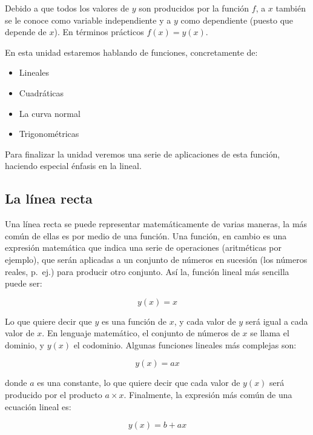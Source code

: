 \documentclass[
]{book}
\providecommand{\tightlist}{%
  \setlength{\itemsep}{0pt}\setlength{\parskip}{0pt}}
\begin{document}
Debido a que todos los valores de \(y\) son producidos por la función \(f\), a \(x\) también se le conoce como variable independiente y a \(y\) como dependiente (puesto que depende de \(x\)). En términos prácticos \(f(x) = y(x)\).

En esta unidad estaremos hablando de funciones, concretamente de:

\begin{itemize}
\tightlist
\item
  Lineales
\item
  Cuadráticas
\item
  La curva normal
\item
  Trigonométricas
\end{itemize}

Para finalizar la unidad veremos una serie de aplicaciones de esta función, haciendo especial énfasis en la lineal.

\hypertarget{la-luxednea-recta}{%
\subsection{La línea recta}\label{la-luxednea-recta}}

Una línea recta se puede representar matemáticamente de varias maneras, la más común de ellas es por medio de una función. Una función, en cambio es una expresión matemática que indica una serie de operaciones (aritméticas por ejemplo), que serán aplicadas a un conjunto de números en sucesión (los números reales, p.~ej.) para producir otro conjunto. Así la, función lineal más sencilla puede ser:

\begin{equation}
    y(x) = x
\end{equation}

Lo que quiere decir que \(y\) es una función de \(x\), y cada valor de \(y\) será igual a cada valor de \(x\). En lenguaje matemático, el conjunto de números de \(x\) se llama el dominio, y \(y(x)\) el codominio. Algunas funciones lineales más complejas son:

\begin{equation}
    y(x) = ax
\end{equation}

donde \(a\) es una constante, lo que quiere decir que cada valor de \(y(x)\) será producido por el producto \(a \times x\). Finalmente, la expresión más común de una ecuación lineal es:

\begin{equation}
    y(x) = b + ax
\end{equation}
\end{document}
